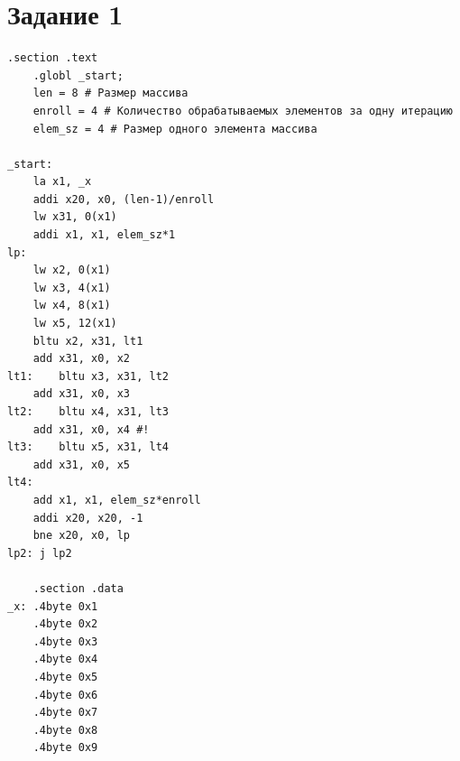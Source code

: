 \clearpage
\section{Задание 1}

\begin{lstlisting}[label={common_asm}, language={RISC-V}, caption=Исходный текст программы для варианта 21]
    .section .text
    .globl _start;
    len = 8 # Размер массива
    enroll = 4 # Количество обрабатываемых элементов за одну итерацию
    elem_sz = 4 # Размер одного элемента массива

_start:
    la x1, _x
    addi x20, x0, (len-1)/enroll
    lw x31, 0(x1)
    addi x1, x1, elem_sz*1
lp:
    lw x2, 0(x1)
    lw x3, 4(x1)
    lw x4, 8(x1)
    lw x5, 12(x1)
    bltu x2, x31, lt1
    add x31, x0, x2
lt1:    bltu x3, x31, lt2
    add x31, x0, x3
lt2:    bltu x4, x31, lt3
    add x31, x0, x4 #!
lt3:    bltu x5, x31, lt4
    add x31, x0, x5
lt4:
    add x1, x1, elem_sz*enroll
    addi x20, x20, -1
    bne x20, x0, lp
lp2: j lp2

    .section .data
_x: .4byte 0x1
    .4byte 0x2
    .4byte 0x3
    .4byte 0x4
    .4byte 0x5
    .4byte 0x6
    .4byte 0x7
    .4byte 0x8
    .4byte 0x9

\end{lstlisting}

\clearpage

